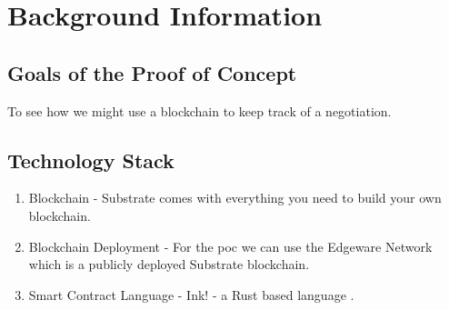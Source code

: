 \chapter{Background Information}

\section{Goals of the Proof of Concept}

To see how we might use a blockchain to keep track of a negotiation. 

\section{Technology Stack}

\begin{enumerate}
    \item Blockchain - Substrate \cite{substrate} comes with everything you need to 
    build your own blockchain.
    \item Blockchain Deployment - For the \acrshort{poc} we can use the Edgeware Network 
    \cite{edgeware} which is a publicly deployed Substrate blockchain.
    \item Smart Contract Language - Ink! - a Rust based language \cite{ink}.
\end{enumerate}